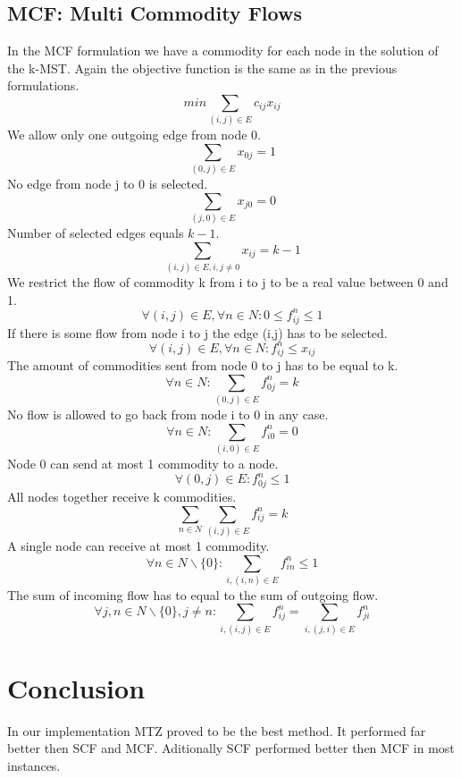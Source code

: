 \documentclass{article}
\begin{document}
\subsection{MCF: Multi Commodity Flows \label{mcf}}
In the MCF formulation we have a commodity for each node in the solution of the k-MST. Again the objective function is the same as in the previous formulations.
\setcounter{equation}{0}
\begin{equation}
min \sum_{(i,j) \in E} c_{ij} x_{ij}
\end{equation}
We allow only one outgoing edge from node 0.
\begin{equation}
\sum_{(0,j) \in E} x_{0j} = 1
\end{equation}
No edge from node j to 0 is selected.
\begin{equation}
\sum_{(j,0) \in E} x_{j0} = 0
\end{equation}
Number of selected edges equals $k-1$.
\begin{equation}
\sum_{(i,j) \in E, i,j \not= 0} x_{ij} = k - 1
\end{equation}
We restrict the flow of commodity k from i to j to be a real value between 0 and 1.
\begin{equation}
\forall (i,j) \in E, \forall n \in N : 0 \le f_{ij}^{n} \le 1
\end{equation}
If there is some flow from node i to j the edge (i,j) has to be selected.
\begin{equation}
\forall (i,j) \in E, \forall n \in N : f_{ij}^{n} \le x_{ij} 
\end{equation}
The amount of commodities sent from node 0 to j has to be equal to k.
\begin{equation}
\forall n \in N: \sum_{(0,j) \in E} f_{0j}^{n} = k
\end{equation}
No flow is allowed to go back from node i to 0 in any case.
\begin{equation}
\forall n \in N: \sum_{(i,0) \in E} f_{i0}^{n} = 0
\end{equation}
Node 0 can send at most 1 commodity to a node.
\begin{equation}
\forall (0,j) \in E : f_{0j}^{n} \le 1
\end{equation}
All nodes together receive k commodities.
\begin{equation}
\sum_{n \in N} \sum_{(i,j) \in E} f_{ij}^{n} = k
\end{equation}
A single node can receive at most 1 commodity.
\begin{equation}
\forall n \in N \backslash \{0\} : \sum_{i,(i,n) \in E} f_{in}^{n} \le 1
\end{equation}
The sum of incoming flow has to equal to the sum of outgoing flow.
\begin{equation}
\forall j,n \in N \backslash \{0\}, j \not= n : \sum_{i,(i,j) \in E} f_{ij}^{n} = \sum_{i,(j,i) \in E} f_{ji}^{n}
\end{equation}



\section{Conclusion}
In our implementation MTZ proved to be the best method. It performed far better then SCF and MCF. Aditionally SCF performed better then MCF in most instances.
\end{document}
